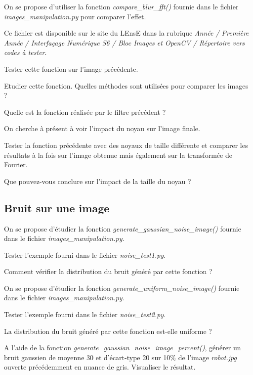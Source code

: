 \documentclass[a4paper,11pt,titlepage]{article} %
\begin{document}
On se propose d'utiliser la fonction \textsl{compare\_blur\_fft()} fournie dans le fichier \textsl{images\_manipulation.py} pour comparer l'effet. 

Ce fichier est disponible sur le site du LEnsE dans la rubrique \textit{Année / Première Année / Interfaçage Numérique S6 / Bloc Images et OpenCV / Répertoire vers codes à tester}.

\Manip Tester cette fonction sur l'image précédente.

\Quest Etudier cette fonction. Quelles méthodes sont utilisées pour comparer les images ?

\Quest Quelle est la fonction réalisée par le filtre précédent ?

\medskip

On cherche à présent à voir l'impact du noyau sur l'image finale.

\Manip Tester la fonction précédente avec des noyaux de taille différente et comparer les résultats à la fois sur l'image obtenue mais également sur la transformée de Fourier.

\Quest Que pouvez-vous conclure sur l'impact de la taille du noyau ?


\subsection{Bruit sur une image}

On se propose d'étudier la fonction \textsl{generate\_gaussian\_noise\_image()} fournie dans le fichier \textsl{images\_manipulation.py}.

\Manip Tester l'exemple fourni dans le fichier \textsl{noise\_test1.py}.

\Quest Comment vérifier la distribution du bruit généré par cette fonction ?

\medskip

On se propose d'étudier la fonction \textsl{generate\_uniform\_noise\_image()} fournie dans le fichier \textsl{images\_manipulation.py}.

\Manip Tester l'exemple fourni dans le fichier \textsl{noise\_test2.py}.

\Quest La distribution du bruit généré par cette fonction est-elle uniforme ?

\Manip A l'aide de la fonction \textsl{generate\_gaussian\_noise\_image\_percent()}, générer un bruit gaussien de moyenne 30 et d'écart-type 20 sur 10\% de l'image \textsl{robot.jpg} ouverte précédemment en nuance de gris. Visualiser le résultat.
\end{document}
